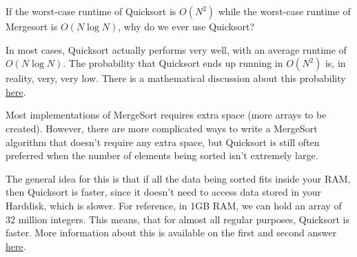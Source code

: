 \begin{blocksection}
\question If the worst-case runtime of Quicksort is $O(N^2)$ while the
worst-case runtime of Mergesort is $O(N \log N)$, why do we ever use Quicksort?

\begin{solution}[1.5in]
In most cases, Quicksort actually performs very well, with an average runtime
of $O(N \log N)$. The probability that Quicksort ends up running in $O(N^2)$
is, in reality, very, very low. There is a mathematical discussion about this
probability \href{https://www.khanacademy.org/computing/computer-science/algorithms/quick-sort/a/analysis-of-quicksort}{here}.

Most implementations of MergeSort requires extra space (more arrays to be
created). However, there are more complicated ways to write a MergeSort
algorithm that doesn't require any extra space, but Quicksort is still often
preferred when the number of elements being sorted isn't extremely large.

The general idea for this is that if all the data being sorted fits inside your
RAM, then Quicksort is faster, since it doesn't need to access data stored in
your Harddisk, which is slower. For reference, in 1GB RAM, we can hold an array
of 32 million integers. This means, that for almost all regular purposes,
Quicksort is faster. More information about this is available on the first and
second answer \href{https://stackoverflow.com/questions/70402/why-is-quicksort-better-than-mergesort}{here}.
\end{solution}
\end{blocksection}
